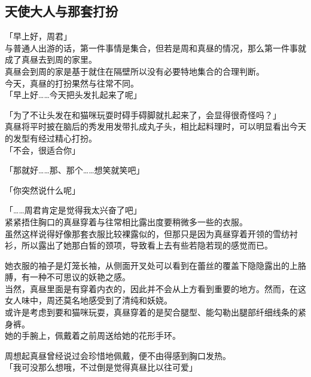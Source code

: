 \subsection{天使大人与那套打扮}

「早上好，周君」\\

与普通人出游的话，第一件事情是集合，但若是周和真昼的情况，那么第一件事就成了真昼去到周的家里。\\

真昼会到周的家是基于就住在隔壁所以没有必要特地集合的合理判断。\\

今天，真昼的打扮果然与往常不同。\\

「早上好……今天把头发扎起来了呢」

「为了不让头发在和猫咪玩耍时碍手碍脚就扎起来了，会显得很奇怪吗？」\\

真昼将平时披在脑后的秀发用发带扎成丸子头，相比起料理时，可以明显看出今天的发型有经过精心打扮。\\

「不会，很适合你」

「那就好……那、那个……想笑就笑吧」

「你突然说什么呢」

「……周君肯定是觉得我太兴奋了吧」\\

紧紧捂住胸口的真昼穿着与往常相比露出度要稍微多一些的衣服。\\

虽然这样说得好像那套衣服比较裸露似的，但那只是因为真昼穿着开领的雪纺衬衫，所以露出了她那白皙的颈项，导致看上去有些若隐若现的感觉而已。

她衣服的袖子是灯笼长袖，从侧面开叉处可以看到在蕾丝的覆盖下隐隐露出的上胳膊，有一种不可思议的妖艳之感。\\

当然，真昼里面是有穿着内衣的，因此并不会从上方看到重要的地方。然而，在这女人味中，周还莫名地感受到了清纯和妖娆。\\

或许是考虑到要和猫咪玩耍，真昼穿着的是契合腿型、能勾勒出腿部纤细线条的紧身裤。\\

她的手腕上，佩戴着之前周送给她的花形手环。

周想起真昼曾经说过会珍惜地佩戴，便不由得感到胸口发热。\\

「我可没那么想哦，不过倒是觉得真昼比以往可爱」

